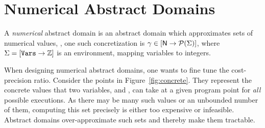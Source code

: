 \documentclass{elsart}
\begin{document}
\section{Numerical Abstract Domains}

A \emph{numerical} abstract domain  is an abstract domain
which approximates sets of numerical values, \eg, one such
concretization is  $\gamma \in [\relax{\mathsf{N}} \rightarrow\mathcal{P}{(\Sigma)}]$, where
$\Sigma = [\mathtt{Vars} \rightarrow\mathbb{Z}]$ is an environment,
mapping variables to integers.

When designing numerical abstract domains, one wants to fine tune the
cost-precision ratio.  Consider the points in Figure~\ref{fig:concrete}.
They represent the concrete values that two variables,  and ,
can take at a given program point for \emph{all} possible
executions.  As there may be many such values or an unbounded number
of them, computing this set precisely is either too expensive or
infeasible. Abstract domains over-approximate such sets and thereby
make them tractable.
\end{document}
